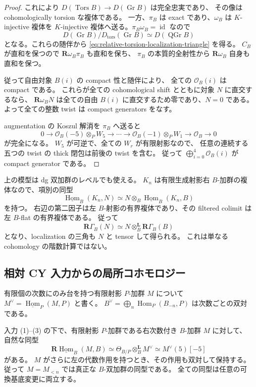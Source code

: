 \begin{proof}
これにより $D(\operatorname{Tors}B)\to D(\operatorname{Gr}B)$ は完全忠実であり、
その像は cohomologically torsion な複体である。
一方、$\pi_B$ は exact であり、$\omega_B$ は $K$-injective 複体を
$K$-injective 複体へ送る。$\pi_B\omega_B=\operatorname{id}$ なので
\[
 D(\operatorname{Gr}B)/D_{\operatorname{tors}}(\operatorname{Gr}B)
 \simeq D(\operatorname{QGr}B)
\]
となる。これらの随伴から \eqref{eq:relative-torsion-localization-triangle} を得る。
$C_B$ が直和を保つので $\mathbf R\omega_B\pi_B$ も直和を保ち、
$\pi_B$ の本質的全射性から $\mathbf R\omega_B$ 自身も直和を保つ。

従って自由対象 $B(i)$ の compact 性と随伴により、
全ての $\mathcal O_B(i)$ は compact である。
これらが全ての cohomological shift とともに対象 $N$ に直交するなら、
$\mathbf R\omega_BN$ は全ての自由 $B(i)$ に直交するため零であり、$N=0$ である。
よって全ての整数 twist は compact generators をなす。

augmentation の Koszul 解消を $\pi_B$ へ送ると
\[
 0\to\mathcal O_B(-5)\otimes_PW_5\to\cdots\to
 \mathcal O_B(-1)\otimes_PW_1\to\mathcal O_B\to0
\]
が完全になる。
$W_5$ が可逆で、全ての $W_r$ が有限射影なので、
任意の連続する五つの twist の thick 閉包は前後の twist を含む。
従って $\bigoplus_{i=0}^4\mathcal O_B(i)$ が compact generator である。
\end{proof}

\begin{remark}
上の模型は dg 双加群のレベルでも使える。
$K_n$ は有限生成射影右 $B$-加群の複体なので、項別の同型
\[
 \underline{\operatorname{Hom}}_B(K_n,N)
 \simeq N\otimes_B
       \underline{\operatorname{Hom}}_B(K_n,B)
\]
を持つ。
右辺の第二因子は左 $B$-射影の有界複体であり、その filtered colimit は
左 $B$-flat の有界複体である。
従って
\[
 \mathbf R\Gamma_B(N)
 \simeq N\otimes_B^{\mathbf L}\mathbf R\Gamma_B(B)
\]
となり、localization の三角も $N$ と tensor して得られる。
これは単なる cohomology の階数計算ではない。
\end{remark}

\subsection{相対 CY 入力からの局所コホモロジー}

有限個の次数にのみ台を持つ有限射影 $P$-加群 $M$ について
$M^\vee=\underline{\operatorname{Hom}}_P(M,P)$ と書く。
$B^\vee=\bigoplus_n\operatorname{Hom}_P(B_{-n},P)$ は次数ごとの双対である。

\begin{lemma}[有限係数加群の双対性]
\label{lem:relative-cy-finite-coefficient-dual}
入力 (1)--(3) の下で、有限射影 $P$-加群である右次数付き $B$-加群 $M$ に対して、
自然な同型
\begin{equation}\label{eq:relative-finite-module-dual}
 \mathbf R\underline{\operatorname{Hom}}_B(M,B)
 \simeq \Theta_{B/P}\otimes_B^{\mathbf L}M^\vee
 \simeq M^\vee(5)[-5]
\end{equation}
がある。
$M$ がさらに左の代数作用を持つとき、その作用も双対して保持する。
従って $M=M_{<n}$ では真正な $B$-双加群の同型である。
全ての同型は任意の可換基底変更に両立する。
\end{lemma}

